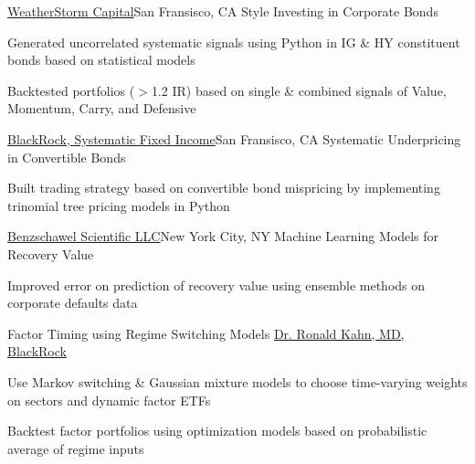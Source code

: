 \documentclass[10pt]{article}
\begin{document}
\spacedhrule{0.8ex}{0.0ex}


\headedsectionfour
{\href{http://www.weatherstormcapital.com/}{WeatherStorm Capital}}{San Fransisco, CA}{}
{Style Investing in Corporate Bonds}
{\vspace{-2.4ex}
    \begin{circlist}
        \item Generated uncorrelated systematic signals using Python in IG \& HY constituent bonds based on statistical models
	    \item Backtested portfolios ($>$1.2 IR) based on single \& combined signals of Value, Momentum, Carry, and Defensive
    \end{circlist}
}



\headedsectionfour
{\href{https://www.blackrock.com/us/individual/investment-ideas/systematic-fixed-income}{BlackRock, Systematic Fixed Income}}{San Fransisco, CA}{}
{Systematic Underpricing in Convertible Bonds}
{\vspace{-2.4ex}
    \begin{circlist}
        \item Built trading strategy based on convertible bond mispricing by implementing trinomial tree pricing models in Python
    \end{circlist}
}


\headedsectionfour
{\href{https://www.linkedin.com/in/terry-benzschawel-64998413/}{Benzschawel Scientific LLC}}{New York City, NY}{}
{Machine Learning Models for Recovery Value}
{\vspace{-2.4ex}
    \begin{circlist}
        \item Improved error on prediction of recovery value using ensemble methods on corporate defaults data
    \end{circlist}
}


\spacedhrule{0.8ex}{0.0ex}




\headedsectiontwo
{Factor Timing using Regime Switching Models}{}
{\href{https://www.blackrock.com/institutions/en-us/biographies/ronald-kahn}{Dr. Ronald Kahn, MD, BlackRock}}
{\vspace{-2.4ex}
    \begin{circlist}
        \item Use Markov switching \& Gaussian mixture models to choose time-varying weights on sectors and dynamic factor ETFs
        \item Backtest factor portfolios using optimization models based on probabilistic average of regime inputs
    \end{circlist}
}
\end{document}
